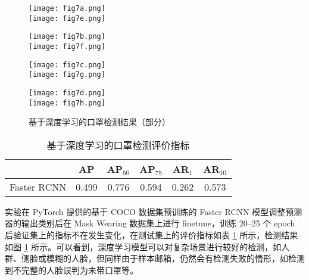 \begin{figure}[!ht]
	\centering
	\begin{minipage}[t]{0.235\linewidth}
		\centering
		\texttt{[image: fig7a.png]}\\
		\texttt{[image: fig7e.png]}
	\end{minipage}
	\begin{minipage}[t]{0.235\linewidth}
		\centering
		\texttt{[image: fig7b.png]}\\
		\texttt{[image: fig7f.png]}
	\end{minipage}
	\begin{minipage}[t]{0.235\linewidth}
		\centering
		\texttt{[image: fig7c.png]}\\
		\texttt{[image: fig7g.png]}
	\end{minipage}
	\begin{minipage}[t]{0.235\linewidth}
		\centering
		\texttt{[image: fig7d.png]}\\
		\texttt{[image: fig7h.png]}
	\end{minipage}
	\caption{基于深度学习的口罩检测结果（部分）}
\label{fig:mask}
\end{figure}

\begin{table}[!ht]
	\centering
	\caption{基于深度学习的口罩检测评价指标}
	\begin{tabular}{c|c|cccc}
	\toprule
		&AP&AP$_{50}$&AP$_{75}$&AR$_1$&AR$_{10}$\\\hline
	Faster RCNN	&0.499&0.776&0.594&0.262&0.573\\
	\bottomrule
	\end{tabular}
	\label{tab:mask_metric}
\end{table}


实验在 PyTorch 提供的基于 COCO 数据集预训练的 Faster RCNN 模型调整预测器的输出类别后在 Mask Wearing 数据集上进行 finetune，训练 20--25 个 epoch 后验证集上的指标不在发生变化，在测试集上的评价指标如表 \ref{tab:mask_metric} 所示，检测结果如图 \ref{fig:mask} 所示。可以看到，深度学习模型可以对复杂场景进行较好的检测，如人群、侧脸或模糊的人脸，但同样由于样本邮箱，仍然会有检测失败的情形，如检测到不完整的人脸误判为未带口罩等。

